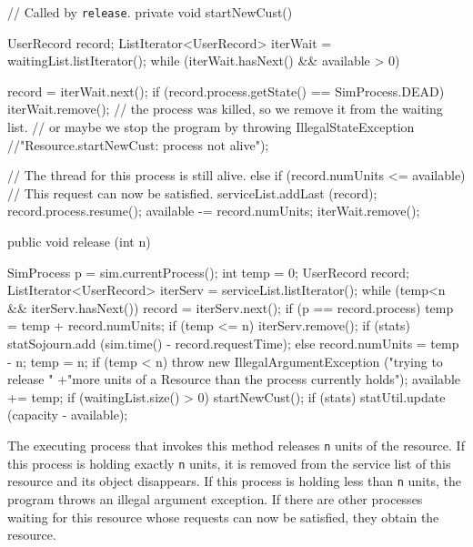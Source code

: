 \fi  %
\begin{code}\begin{hide}

   // Called by \texttt{release}. 
   private void startNewCust() {
       UserRecord record;
       ListIterator<UserRecord> iterWait = waitingList.listIterator();
       while (iterWait.hasNext() && available > 0) {
           record = iterWait.next();
           if (record.process.getState() == SimProcess.DEAD) iterWait.remove(); 
              // the process was killed, so we remove it from the waiting list.
              // or maybe we stop the program by throwing IllegalStateException
              //"Resource.startNewCust: process not alive");

               // The thread for this process is still alive.
           else if (record.numUnits <= available) {
               // This request can now be satisfied.
               serviceList.addLast (record);
               record.process.resume();
               available -= record.numUnits;
               iterWait.remove();
           }
       }
    }\end{hide}

   public void release (int n) \begin{hide} {
        SimProcess p = sim.currentProcess();
        int temp = 0;
        UserRecord record;
        ListIterator<UserRecord> iterServ = serviceList.listIterator();
        while (temp<n && iterServ.hasNext()) {
            record = iterServ.next();
            if (p == record.process) {
                temp = temp + record.numUnits;
                if (temp <= n) {
                    iterServ.remove();
                    if (stats) statSojourn.add
                                   (sim.time() - record.requestTime);
                }
                else {
                    record.numUnits = temp - n;
                    temp = n;
                }
            }
        }
        if (temp < n)  throw new IllegalArgumentException ("trying to release "
                +"more units of a Resource than the process currently holds");
        available += temp;
        if (waitingList.size() > 0)  startNewCust();
        if (stats) statUtil.update (capacity - available);
    }\end{hide}
\end{code}
\begin{tabb}  The executing process that invokes this method releases 
  \texttt{n} units of the resource.  If this process is holding exactly
  \texttt{n} units, it is removed from the service list of this resource
  and its  object disappears.
  If this process is holding less than \texttt{n} units, 
  the program throws an illegal argument exception.
  If there are other processes waiting for this resource whose requests
  can now be satisfied, they obtain the resource.
\end{tabb}

